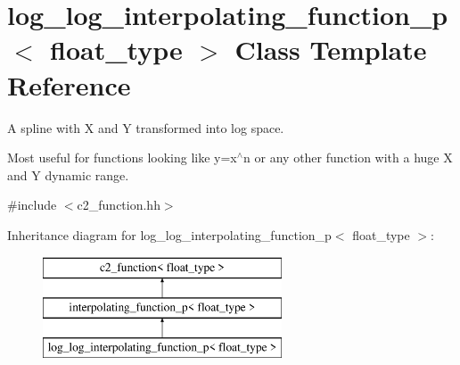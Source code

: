 \hypertarget{classlog__log__interpolating__function__p}{\section{log\-\_\-log\-\_\-interpolating\-\_\-function\-\_\-p$<$ float\-\_\-type $>$ Class Template Reference}
\label{classlog__log__interpolating__function__p}
}


A spline with X and Y transformed into log space.

Most useful for functions looking like y=x$^\wedge$n or any other function with a huge X and Y dynamic range.  




{\ttfamily \#include $<$c2\-\_\-function.\-hh$>$}

Inheritance diagram for log\-\_\-log\-\_\-interpolating\-\_\-function\-\_\-p$<$ float\-\_\-type $>$\-:\begin{figure}[H]
\begin{center}
\leavevmode
\includegraphics[height=3.000000cm]{classlog__log__interpolating__function__p}
\end{center}
\end{figure}
